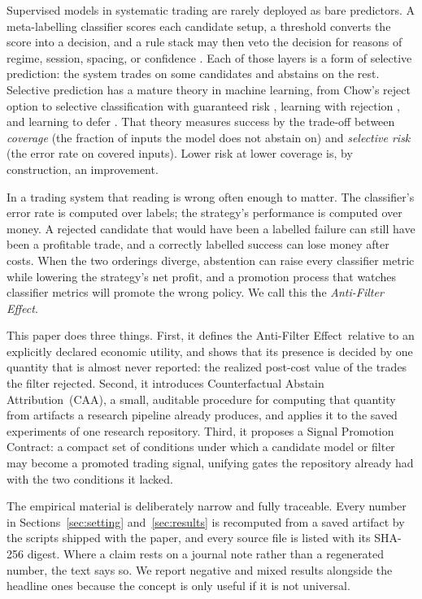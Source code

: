 \documentclass[10pt]{article}
\newcommand{\AF}{Anti-Filter Effect}
\newcommand{\CAA}{Counterfactual Abstain Attribution}
\newcommand{\SPC}{Signal Promotion Contract}
\begin{document}
Supervised models in systematic trading are rarely deployed as bare predictors. A meta-labelling classifier scores each candidate setup, a threshold converts the score into a decision, and a rule stack may then veto the decision for reasons of regime, session, spacing, or confidence \citep{lopezdeprado2018,thumm2023}. Each of those layers is a form of selective prediction: the system trades on some candidates and abstains on the rest. Selective prediction has a mature theory in machine learning, from Chow's reject option \citep{chow1970} to selective classification with guaranteed risk \citep{elyaniv2010,geifman2017}, learning with rejection \citep{cortes2016}, and learning to defer \citep{madras2018,mozannar2020}. That theory measures success by the trade-off between \emph{coverage} (the fraction of inputs the model does not abstain on) and \emph{selective risk} (the error rate on covered inputs). Lower risk at lower coverage is, by construction, an improvement.

In a trading system that reading is wrong often enough to matter. The classifier's error rate is computed over labels; the strategy's performance is computed over money. A rejected candidate that would have been a labelled failure can still have been a profitable trade, and a correctly labelled success can lose money after costs. When the two orderings diverge, abstention can raise every classifier metric while lowering the strategy's net profit, and a promotion process that watches classifier metrics will promote the wrong policy. We call this the \emph{\AF}.

This paper does three things. First, it defines the \AF\ relative to an explicitly declared economic utility, and shows that its presence is decided by one quantity that is almost never reported: the realized post-cost value of the trades the filter rejected. Second, it introduces \CAA\ (CAA), a small, auditable procedure for computing that quantity from artifacts a research pipeline already produces, and applies it to the saved experiments of one research repository. Third, it proposes a \SPC: a compact set of conditions under which a candidate model or filter may become a promoted trading signal, unifying gates the repository already had with the two conditions it lacked.

The empirical material is deliberately narrow and fully traceable. Every number in Sections~\ref{sec:setting} and~\ref{sec:results} is recomputed from a saved artifact by the scripts shipped with the paper, and every source file is listed with its SHA-256 digest. Where a claim rests on a journal note rather than a regenerated number, the text says so. We report negative and mixed results alongside the headline ones because the concept is only useful if it is not universal.
\end{document}
